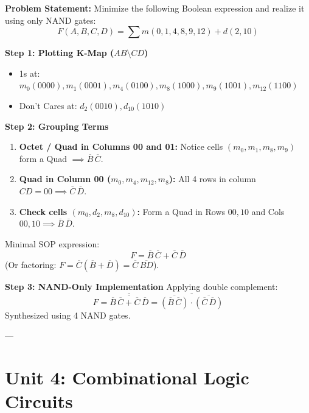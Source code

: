 \begin{example}
\textbf{Problem Statement:} Minimize the following Boolean expression and realize it using only NAND gates:
\begin{equation*}
    F(A,B,C,D) = \sum m(0, 1, 4, 8, 9, 12) + d(2, 10)
\end{equation*}

\tcblower
\textbf{Step 1: Plotting K-Map ($AB \setminus CD$)}
\begin{itemize}
    \item 1s at: $m_0(0000), m_1(0001), m_4(0100), m_8(1000), m_9(1001), m_{12}(1100)$
    \item Don't Cares at: $d_2(0010), d_{10}(1010)$
\end{itemize}

\textbf{Step 2: Grouping Terms}
\begin{enumerate}
    \item \textbf{Octet / Quad in Columns 00 and 01:}
    Notice cells $(m_0, m_1, m_8, m_9)$ form a Quad $\implies \overline{B}\,\overline{C}$.
    \item \textbf{Quad in Column 00 ($m_0, m_4, m_{12}, m_8$):}
    All 4 rows in column $CD = 00 \implies \overline{C}\,\overline{D}$.
    \item \textbf{Check cells $(m_0, d_2, m_8, d_{10})$:}
    Form a Quad in Rows $00, 10$ and Cols $00, 10 \implies \overline{B}\,\overline{D}$.
\end{enumerate}

Minimal SOP expression:
\begin{equation*}
    F = \overline{B}\,\overline{C} + \overline{C}\,\overline{D}
\end{equation*}
(Or factoring: $F = \overline{C}(\overline{B} + \overline{D}) = \overline{C}\,\overline{BD}$).

\textbf{Step 3: NAND-Only Implementation}
Applying double complement:
\begin{equation*}
    F = \overline{\overline{\overline{B}\,\overline{C} + \overline{C}\,\overline{D}}} = \overline{\overline{(\overline{B}\,\overline{C})} \cdot \overline{(\overline{C}\,\overline{D})}}
\end{equation*}
Synthesized using 4 NAND gates.
\end{example}

---

\section{Unit 4: Combinational Logic Circuits}

